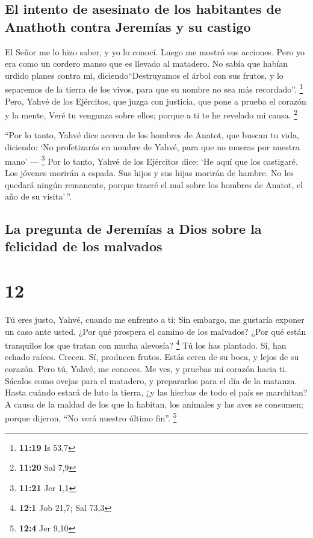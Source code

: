 \hypertarget{el-intento-de-asesinato-de-los-habitantes-de-anathoth-contra-jeremuxedas-y-su-castigo}{%
\subsection{El intento de asesinato de los habitantes de Anathoth contra
Jeremías y su
castigo}\label{el-intento-de-asesinato-de-los-habitantes-de-anathoth-contra-jeremuxedas-y-su-castigo}}

 El Señor me lo hizo saber, y yo lo conocí. Luego me
mostró sus acciones.  Pero yo era como un cordero manso
que es llevado al matadero. No sabía que habían urdido planes contra mí,
diciendo``Destruyamos el árbol con sus frutos, y lo separemos de la
tierra de los vivos, para que su nombre no sea más recordado''.
\footnote{\textbf{11:19} Is 53,7}  Pero, Yahvé de los
Ejércitos, que juzga con justicia, que pone a prueba el corazón y la
mente, Veré tu venganza sobre ellos; porque a ti te he revelado mi
causa. \footnote{\textbf{11:20} Sal 7,9}

 ``Por lo tanto, Yahvé dice acerca de los hombres de
Anatot, que buscan tu vida, diciendo: `No profetizarás en nombre de
Yahvé, para que no mueras por nuestra mano' --- \footnote{\textbf{11:21}
  Jer 1,1}  Por lo tanto, Yahvé de los Ejércitos dice:
`He aquí que los castigaré. Los jóvenes morirán a espada. Sus hijos y
sus hijas morirán de hambre.  No les quedará ningún
remanente, porque traeré el mal sobre los hombres de Anatot, el año de
su visita'\,''.

\hypertarget{la-pregunta-de-jeremuxedas-a-dios-sobre-la-felicidad-de-los-malvados}{%
\subsection{La pregunta de Jeremías a Dios sobre la felicidad de los
malvados}\label{la-pregunta-de-jeremuxedas-a-dios-sobre-la-felicidad-de-los-malvados}}

\hypertarget{section-11}{%
\section{12}\label{section-11}}

 Tú eres justo, Yahvé, cuando me enfrento a ti; Sin
embargo, me gustaría exponer un caso ante usted. ¿Por qué prospera el
camino de los malvados? ¿Por qué están tranquilos los que tratan con
mucha alevosía? \footnote{\textbf{12:1} Job 21,7; Sal 73,3}
 Tú los has plantado. Sí, han echado raíces. Crecen. Sí,
producen frutos. Estás cerca de su boca, y lejos de su corazón.
 Pero tú, Yahvé, me conoces. Me ves, y pruebas mi corazón
hacia ti. Sácalos como ovejas para el matadero, y prepararlos para el
día de la matanza.  Hasta cuándo estará de luto la tierra,
¿y las hierbas de todo el país se marchitan? A causa de la maldad de los
que la habitan, los animales y las aves se consumen; porque dijeron,
``No verá nuestro último fin''. \footnote{\textbf{12:4} Jer 9,10}

